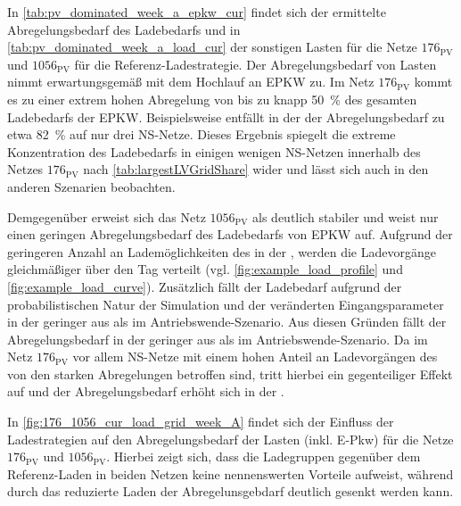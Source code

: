 



In \autoref{tab:pv_dominated_week_a_epkw_cur} findet sich der ermittelte Abregelungsbedarf des Ladebedarfs und in \autoref{tab:pv_dominated_week_a_load_cur} der sonstigen Lasten für die Netze \(176_{\text{PV}}\) und \(1056_{\text{PV}}\) für die Referenz-Ladestrategie.
Der Abregelungsbedarf von Lasten nimmt erwartungsgemäß mit dem Hochlauf an \gls{EPKW} zu.
Im Netz \(176_{\text{PV}}\) kommt es zu einer extrem hohen Abregelung von bis zu knapp \SI{50}{\percent} des gesamten Ladebedarfs der \gls{EPKW}.
Beispielsweise entfällt in der \SzeFirmenparkplatz der Abregelungsbedarf zu etwa \SI{82}{\percent} auf nur drei \gls{NS}-Netze.
Dieses Ergebnis spiegelt die extreme Konzentration des Ladebedarfs in einigen wenigen \gls{NS}-Netzen innerhalb des Netzes \(176_{\text{PV}}\) nach \autoref{tab:largestLVGridShare} wider und lässt sich auch in den anderen Szenarien beobachten.

Demgegenüber erweist sich das Netz \(1056_{\text{PV}}\) als deutlich stabiler und weist nur einen geringen Abregelungsbedarf des Ladebedarfs von \gls{EPKW} auf.
Aufgrund der geringeren Anzahl an Lademöglichkeiten des \UC \Firmeparkplatz in der \SzeFirmenparkplatzdot, werden die Ladevorgänge gleichmäßiger über den Tag verteilt (vgl. \autoref{fig:example_load_profile} und \autoref{fig:example_load_curve}).
Zusätzlich fällt der Ladebedarf aufgrund der probabilistischen Natur der Simulation und der veränderten Eingangsparameter in der \SzeFirmenparkplatz geringer aus als im Antriebswende-Szenario.
Aus diesen Gründen fällt der Abregelungsbedarf in der \SzeFirmenparkplatz geringer aus als im Antriebswende-Szenario.
Da im Netz \(176_{\text{PV}}\) vor allem \gls{NS}-Netze mit einem hohen Anteil an Ladevorgängen des \UCs \zH von den starken Abregelungen betroffen sind, tritt hierbei ein gegenteiliger Effekt auf und der Abregelungsbedarf erhöht sich in der \SzeFirmenparkplatzdot.





In \autoref{fig:176_1056_cur_load_grid_week_A} findet sich der Einfluss der Ladestrategien auf den Abregelungsbedarf der Lasten (inkl. E-Pkw) für die Netze \(176_{\text{PV}}\) und \(1056_{\text{PV}}\).
Hierbei zeigt sich, dass die Ladegruppen gegenüber dem Referenz-Laden in beiden Netzen keine nennenswerten Vorteile aufweist, während durch das reduzierte Laden der Abregelunsgebdarf deutlich gesenkt werden kann.

